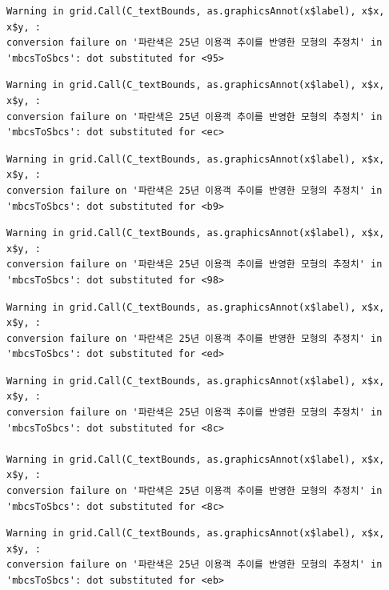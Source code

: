 \documentclass[
  letterpaper,
  DIV=11,
  numbers=noendperiod]{scrreprt}
\begin{document}
\begin{verbatim}
Warning in grid.Call(C_textBounds, as.graphicsAnnot(x$label), x$x, x$y, :
conversion failure on '파란색은 25년 이용객 추이를 반영한 모형의 추정치' in
'mbcsToSbcs': dot substituted for <95>
\end{verbatim}

\begin{verbatim}
Warning in grid.Call(C_textBounds, as.graphicsAnnot(x$label), x$x, x$y, :
conversion failure on '파란색은 25년 이용객 추이를 반영한 모형의 추정치' in
'mbcsToSbcs': dot substituted for <ec>
\end{verbatim}

\begin{verbatim}
Warning in grid.Call(C_textBounds, as.graphicsAnnot(x$label), x$x, x$y, :
conversion failure on '파란색은 25년 이용객 추이를 반영한 모형의 추정치' in
'mbcsToSbcs': dot substituted for <b9>
\end{verbatim}

\begin{verbatim}
Warning in grid.Call(C_textBounds, as.graphicsAnnot(x$label), x$x, x$y, :
conversion failure on '파란색은 25년 이용객 추이를 반영한 모형의 추정치' in
'mbcsToSbcs': dot substituted for <98>
\end{verbatim}

\begin{verbatim}
Warning in grid.Call(C_textBounds, as.graphicsAnnot(x$label), x$x, x$y, :
conversion failure on '파란색은 25년 이용객 추이를 반영한 모형의 추정치' in
'mbcsToSbcs': dot substituted for <ed>
\end{verbatim}

\begin{verbatim}
Warning in grid.Call(C_textBounds, as.graphicsAnnot(x$label), x$x, x$y, :
conversion failure on '파란색은 25년 이용객 추이를 반영한 모형의 추정치' in
'mbcsToSbcs': dot substituted for <8c>

Warning in grid.Call(C_textBounds, as.graphicsAnnot(x$label), x$x, x$y, :
conversion failure on '파란색은 25년 이용객 추이를 반영한 모형의 추정치' in
'mbcsToSbcs': dot substituted for <8c>
\end{verbatim}

\begin{verbatim}
Warning in grid.Call(C_textBounds, as.graphicsAnnot(x$label), x$x, x$y, :
conversion failure on '파란색은 25년 이용객 추이를 반영한 모형의 추정치' in
'mbcsToSbcs': dot substituted for <eb>
\end{verbatim}
\end{document}
